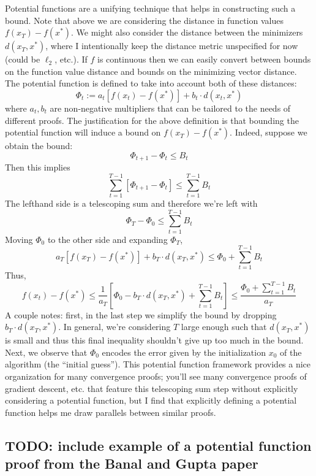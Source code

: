 \documentclass[12pt]{article}
\begin{document}
Potential functions are a unifying technique that helps in constructing such a bound. Note that above we are considering the distance in function values $f(x_T) - f(x^*)$. We might also consider the distance 
between the minimizers $d(x_T, x^*)$, where I intentionally keep the distance metric unspecified for now (could be $\ell_2$, etc.). If $f$ is continuous then we can easily convert between bounds on the function
value distance and bounds on the minimizing vector distance. The potential function is defined to take into account both of these distances: 
\[\Phi_t := a_t [f(x_t) - f(x^*)] + b_t \cdot d(x_t, x^*)\]
where $a_t, b_t$ are non-negative multipliers that can be tailored to the needs of different proofs. The justification for the above definition is that bounding the potential function will induce a bound on 
$f(x_T) - f(x^*)$. Indeed, suppose we obtain the bound: 
\[\Phi_{t + 1} - \Phi_t \leq B_t\]
Then this implies
\[\sum_{t = 1}^{T - 1} [\Phi_{t + 1} - \Phi_t] \leq  \sum_{t = 1}^{T - 1} B_t\]
The lefthand side is a telescoping sum and therefore we're left with 
\[\Phi_{T} - \Phi_0 \leq  \sum_{t = 1}^{T - 1} B_t\]
Moving $\Phi_0$ to the other side and expanding $\Phi_{T}$, 
\[ a_T [f(x_T) - f(x^*)] + b_T \cdot d(x_T, x^*) \leq \Phi_0 + \sum_{t = 1}^{T - 1} B_t\]
Thus, 
\[ f(x_t) - f(x^*) \leq \frac{1}{a_T}\left[\Phi_0 - b_T \cdot d(x_T, x^*) + \sum_{t = 1}^{T - 1} B_t\right] \leq \frac{\Phi_0 + \sum_{t = 1}^{T - 1} B_t}{a_T}\]
A couple notes: first, in the last step we simplify the bound by dropping $b_T \cdot d(x_T, x^*)$. In general, we're considering $T$ large enough such that $d(x_T, x^*)$ is small and thus
this final inequality shouldn't give up too much in the bound. Next, we observe that $\Phi_0$ encodes the error given by the initialization $x_0$ of the algorithm (the ``initial guess''). This potential
function framework provides a nice organization for many convergence proofs; you'll see many convergence proofs of gradient descent, etc. that feature this telescoping sum step without explicitly 
considering a potential function, but I find that explicitly defining a potential function helps me draw parallels between similar proofs. 

\subsection{TODO: include example of a potential function proof from the Banal and Gupta paper}


\end{document}
